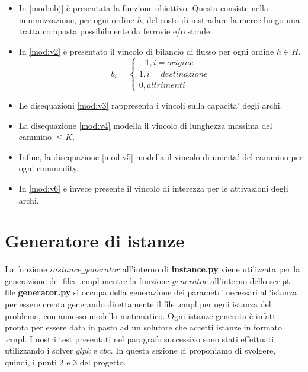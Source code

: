 \documentclass{article}
\begin{document}
\begin{itemize}


    \item In \eqref{mod:obj} è presentata la funzione obiettivo. Questa consiste nella minimizzazione, per ogni ordine $h$, del costo di instradare la merce lungo una tratta composta possibilmente da ferrovie e/o strade.
    
    \item In \eqref{mod:v2} è presentato il vincolo di bilancio di flusso per ogni ordine $h \in H$.
    \begin{equation*}
    b_i =
    \begin{cases}
      -1, i = origine \\
      1, i = destinazione \\
      0, altrimenti
    \end{cases}
    \end{equation*}

    \item Le disequazioni \eqref{mod:v3} rappresenta i vincoli sulla capacita' degli archi.
    \item La disequazione \eqref{mod:v4} modella il vincolo di lunghezza massima del cammino $\leq K$.
    \item Infine, la disequazione \eqref{mod:v5} modella il vincolo di unicita' del cammino per ogni commodity.
    \item In \eqref{mod:v6} \`e invece presente il vincolo di interezza per le attivazioni degli archi.

\end{itemize}


\section{Generatore di istanze}
La funzione $instance\_generator$ all'interno di \textbf{instance.py} viene utilizzata per la generazione dei files .cmpl mentre la funzione $generator$ all'interno dello script file \textbf{generator.py} si occupa della generazione dei parametri necessari all'istanza per essere creata generando direttamente il file .cmpl per ogni istanza del problema, con annesso modello matematico. Ogni istanze generata è infatti pronta per essere data in pasto ad un solutore che accetti istanze in formato .cmpl. I nostri test presentati nel paragrafo successivo sono stati effettuati utilizzando i solver $glpk$ e $cbc$. In questa sezione ci proponiamo di svolgere, quindi, i punti 2 e 3 del progetto.
\end{document}
